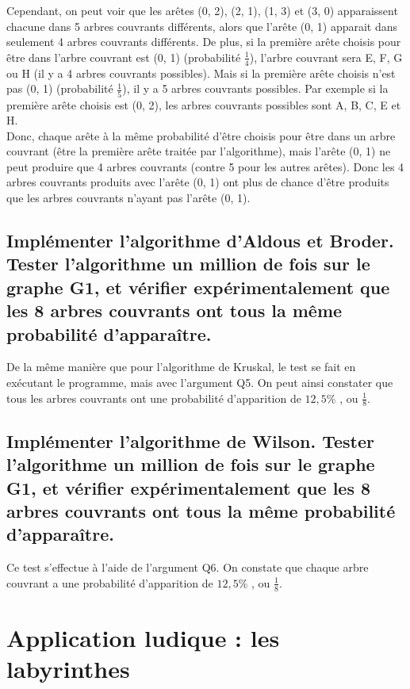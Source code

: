 \documentclass[a4paper,11pt]{article}
\begin{document}
            Cependant, on peut voir que les arêtes (0, 2), (2, 1), (1, 3) et (3, 0) apparaissent chacune dans 5 arbres couvrants différents,
            alors que l'arête (0, 1) apparait dans seulement 4 arbres couvrants différents.
            De plus, si la première arête choisis pour être dans l'arbre couvrant est (0, 1) (probabilité $\frac{1}{4}$),
            l'arbre couvrant sera E, F, G ou H (il y a 4 arbres couvrants possibles).
            Mais si la première arête choisis n'est pas (0, 1) (probabilité $\frac{1}{5}$),
            il y a 5 arbres couvrants possibles.
            Par exemple si la première arête choisis est (0, 2), les arbres couvrants possibles sont A, B, C, E et H.\\

            Donc, chaque arête à la même probabilité d'être choisis pour être dans un arbre couvrant
            (être la première arête traitée par l'algorithme),
            mais l'arête (0, 1) ne peut produire que 4 arbres couvrants (contre 5 pour les autres arêtes).
            Donc les 4 arbres couvrants produits avec l'arête (0, 1) ont plus de chance d'être produits que les arbres couvrants n'ayant pas l'arête (0, 1).
    
        \subsection{Implémenter l'algorithme d'Aldous et Broder. Tester l'algorithme un million de fois sur le graphe G1,
        et vérifier expérimentalement que les 8 arbres couvrants ont tous la même probabilité d'apparaître.}\label{subsec:Q5}
            De la même manière que pour l'algorithme de Kruskal, le test se fait en exécutant le programme, mais avec l'argument Q5.
            On peut ainsi constater que tous les arbres couvrants ont une probabilité d'apparition de $12,5\%$ , ou $\frac{1}{8}$.

        \subsection{Implémenter l'algorithme de Wilson. Tester l'algorithme un million de fois sur le graphe G1,
        et vérifier expérimentalement que les 8 arbres couvrants ont tous la même probabilité d'apparaître.}\label{subsec:Q6}
            Ce test s'effectue à l'aide de l'argument Q6.
            On constate que chaque arbre couvrant a une probabilité d'apparition de $12,5\%$ , ou $\frac{1}{8}$.

    \section{Application ludique : les labyrinthes}\label{sec:labyrinthes}
\end{document}
